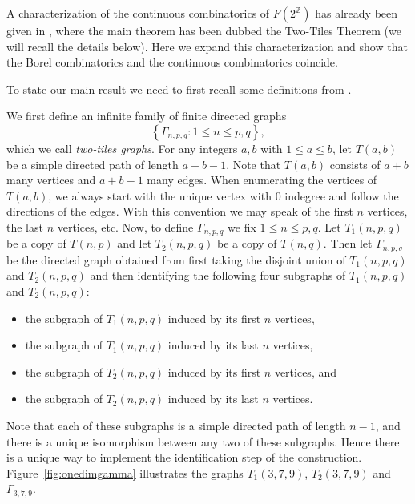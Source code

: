 \documentclass[11pt]{amsart}
\theoremstyle{definition}
\def\Z{\mathbb{Z}}
\def\Z{\mathbb{Z}}
\begin{document}
A characterization of the continuous combinatorics of $F(2^\Z)$ has already been given in \cite[Section 2.2]{GJKS}, where the main theorem \cite[Theorem 2.2.2]{GJKS} has been dubbed the Two-Tiles Theorem (we will recall the details below). Here we expand this characterization and show that the Borel combinatorics and the continuous combinatorics coincide. 

To state our main result we need to first recall some definitions from \cite[Section 2.2]{GJKS}. 

We first define an infinite family of finite directed graphs 
$$\left\{\Gamma_{n,p,q}\colon 1\leq n\leq p, q\right\},$$ 
which we call {\em two-tiles graphs}. For any integers $a, b$ with $1\leq a\leq b$, let $T(a,b)$ be a simple directed path of length $a+b-1$. Note that $T(a, b)$ consists of $a+b$ many vertices and $a+b-1$ many edges. When enumerating the vertices of $T(a,b)$, we always start with the unique vertex with $0$ indegree and follow the directions of the edges. With this convention we may speak of the first $n$ vertices, the last $n$ vertices, etc. Now, to define $\Gamma_{n,p,q}$ we fix $1\leq n\leq p, q$. Let $T_1(n, p, q)$ be a copy of $T(n,p)$ and let $T_2(n,p,q)$ be a copy of $T(n,q)$. Then let $\Gamma_{n,p,q}$ be the directed graph obtained from first taking the disjoint union of $T_1(n,p,q)$ and $T_2(n,p,q)$ and then identifying the following four subgraphs of $T_1(n,p, q)$ and $T_2(n,p,q)$:
\begin{itemize}
\item the subgraph of $T_1(n,p,q)$ induced by its first $n$ vertices,
\item the subgraph of $T_1(n,p,q)$ induced by its last $n$ vertices,
\item the subgraph of $T_2(n,p,q)$ induced by its first $n$ vertices, and
\item the subgraph of $T_2(n,p,q)$ induced by its last $n$ vertices.
\end{itemize}
Note that each of these subgraphs is a simple directed path of length $n-1$, and there is a unique isomorphism between any two of these subgraphs. Hence there is a unique way to implement the identification step of the construction. Figure~\ref{fig:onedimgamma} illustrates the graphs $T_1(3,7,9)$, $T_2(3,7,9)$ and $\Gamma_{3,7,9}$.
\end{document}
